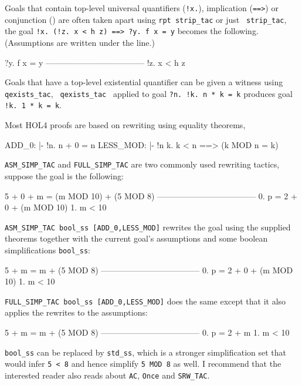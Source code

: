 \documentclass[a4paper,10pt]{article}
\begin{document}

Goals that contain top-level universal quantifiers ({\tt !x.}),
implication ({\tt ==>}) or conjunction ({\tt \conj{}}) are often
taken apart using {\tt\small rpt strip\_tac} or just {\tt\small
  strip\_tac}, \eg{} the goal {\tt\small \sq !x{.}~(!z{.}~x < h z) ==> ?y{.}~f x = y\sq}
becomes the following. (Assumptions are written under the line.)
\begin{code}
    ?y. f x = y
    ------------------------------------
      !z. x < h z
\end{code}


Goals that have a top-level existential quantifier can be given a
witness using {\tt \small qexists\_tac}, \eg{} {\tt \small
  qexists\_tac \sq} applied to goal {\tt \small ?n{.}~!k{.}~n * k = k}
produces goal {\tt \small !k{.}~1 * k = k}.


Most HOL4 proofs are based on rewriting using equality theorems, \eg{}
\begin{code}
ADD_0:            |- !n. n + 0 = n
LESS_MOD:         |- !n k. k < n ==> (k MOD n = k)
\end{code} {\tt \small ASM\_SIMP\_TAC} and {\tt \small FULL\_SIMP\_TAC} are two
commonly used rewriting tactics, \eg{} suppose the goal is the following:
\begin{code}
    5 + 0 + m = (m MOD 10) + (5 MOD 8)
    ------------------------------------
      0.  p = 2 + 0 + (m MOD 10)
      1.  m < 10
\end{code}
{\tt \small ASM\_SIMP\_TAC bool\_ss
  [ADD\_0,LESS\_MOD]} rewrites the
goal using the supplied theorems together with the current goal's
assumptions and some boolean simplifications {\tt \small bool\_ss}:
\begin{code}
    5 + m = m + (5 MOD 8)
    ------------------------------------
      0.  p = 2 + 0 + (m MOD 10)
      1.  m < 10
\end{code}
{\tt \small FULL\_SIMP\_TAC bool\_ss [ADD\_0,LESS\_MOD]}
does the same except that it also applies the rewrites to the
assumptions:
\begin{code}
    5 + m = m + (5 MOD 8)
    ------------------------------------
      0.  p = 2 + m
      1.  m < 10
\end{code}

{\tt \small bool\_ss} can be replaced by {\tt \small std\_ss}, which
is a stronger simplification set that would infer {\tt \small 5 < 8}
and hence simplify {\tt\small 5 MOD 8} as well. I recommend that the
interested reader also reads about {\tt\small AC}, {\tt\small Once}
and {\tt\small SRW\_TAC}.
\end{document}
